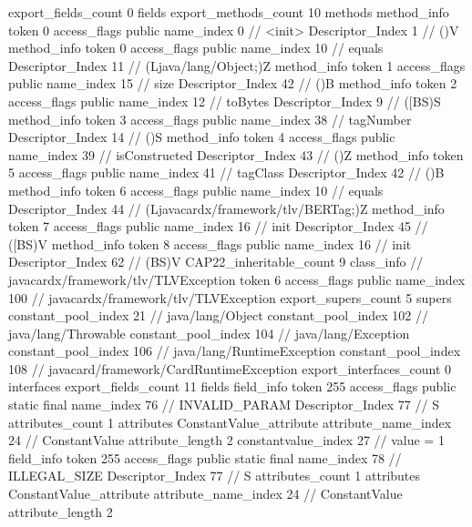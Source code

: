 {{{{			}
			export_fields_count	0
			fields {
			}
			export_methods_count	10
			methods {
				method_info {
					token	0
					access_flags	public
					name_index	0		// <init>
					Descriptor_Index	1		// ()V
				}
				method_info {
					token	0
					access_flags	public
					name_index	10		// equals
					Descriptor_Index	11		// (Ljava/lang/Object;)Z
				}
				method_info {
					token	1
					access_flags	public
					name_index	15		// size
					Descriptor_Index	42		// ()B
				}
				method_info {
					token	2
					access_flags	public
					name_index	12		// toBytes
					Descriptor_Index	9		// ([BS)S
				}
				method_info {
					token	3
					access_flags	public
					name_index	38		// tagNumber
					Descriptor_Index	14		// ()S
				}
				method_info {
					token	4
					access_flags	public
					name_index	39		// isConstructed
					Descriptor_Index	43		// ()Z
				}
				method_info {
					token	5
					access_flags	public
					name_index	41		// tagClass
					Descriptor_Index	42		// ()B
				}
				method_info {
					token	6
					access_flags	public
					name_index	10		// equals
					Descriptor_Index	44		// (Ljavacardx/framework/tlv/BERTag;)Z
				}
				method_info {
					token	7
					access_flags	public
					name_index	16		// init
					Descriptor_Index	45		// ([BS)V
				}
				method_info {
					token	8
					access_flags	public
					name_index	16		// init
					Descriptor_Index	62		// (BS)V
				}
			}
			CAP22_inheritable_count	9
		}
		class_info {		// javacardx/framework/tlv/TLVException
			token	6
			access_flags	public
			name_index	100		// javacardx/framework/tlv/TLVException
			export_supers_count	5
			supers {
				constant_pool_index	21		// java/lang/Object
				constant_pool_index	102		// java/lang/Throwable
				constant_pool_index	104		// java/lang/Exception
				constant_pool_index	106		// java/lang/RuntimeException
				constant_pool_index	108		// javacard/framework/CardRuntimeException
			}
			export_interfaces_count	0
			interfaces {
			}
			export_fields_count	11
			fields {
			field_info {
				token	255
				access_flags	public static final
				name_index	76		// INVALID_PARAM
				Descriptor_Index	77		// S
				attributes_count	1
				attributes {
				ConstantValue_attribute {
					attribute_name_index	24		// ConstantValue
					attribute_length	2
					constantvalue_index	27		// value = 1
				}
				}
			}
			field_info {
				token	255
				access_flags	public static final
				name_index	78		// ILLEGAL_SIZE
				Descriptor_Index	77		// S
				attributes_count	1
				attributes {
				ConstantValue_attribute {
					attribute_name_index	24		// ConstantValue
					attribute_length	2
}}}}}}}
